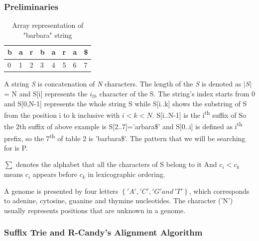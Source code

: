 \documentclass[11pt,a4paper]{report}
\begin{document}

\subsubsection{Preliminaries} \label{Preliminaries}

\begin{table}[h]
 \centering
  \begin{tabular}{ | p{0.5cm} | p{0.5cm} | p{0.5cm} 
  |p{0.5cm} |p{0.5cm} |p{0.5cm} |p{0.5cm} |p{0.5cm} |}
    \hline
  \textbf{b} & \textbf{a } &\textbf{r}  &\textbf{b} 
  &\textbf{a} &\textbf{r} &\textbf{a} &\textbf{\$}\\ \hline
       0 & 1 &2&3&4&5&6&7 \\ \hline
      
   \end{tabular}
\caption{Array representation of "barbara" string}
\label{Array-representation}
\end{table}



A string \emph{S} is concatenation of \emph{N} characters. 
The length of the \emph{S} is denoted as $\lvert S \rvert$ 
= N and S[i] represents the $i_{th}$ character of the S.
The string's index starts from 0 and S[0,N-1] represents 
the whole string S while S[i..k] shows the substring of S 
from the position i to k inclusive with $i < k < N$. 
S[i..N-1] is the i\textsuperscript{th} suffix of So the 
2th suffix of above example is S[2..7]='arbara\$' and
S[0..i] is defined as i\textsuperscript{th} prefix, so 
the 7\textsuperscript{th} of table 2 is 'barbara\$'.
The pattern that we will be searching for is P.

$ \sum $  denotes the alphabet that all the characters of 
S belong to it And $ c_{i} < c_{k}$ means $c_{i}$ appears 
before $c_{k}$ in lexicographic ordering.

A genome is presented by four letters $\left\{ 'A', 'C', 
'G' and\,'T'\right\}$, which corresponds to adenine, cytosine, 
guanine and thymine nucleotides. The character ('N') usually 
represents positions that are unknown in a genome.





\subsubsection{Suffix Trie and R-Candy's Alignment Algorithm} 
\label{Suffix Trie and R-Candy's Alignment Algorithm}
\end{document}
